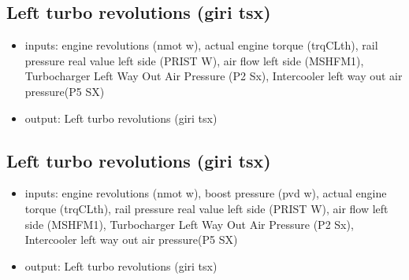 

\subsection{Left turbo revolutions (giri tsx)}
\begin{itemize}
	\item{inputs: engine revolutions (nmot w), actual engine torque (trqCLth), rail pressure real value left side (PRIST W), air flow left side (MSHFM1), Turbocharger Left Way Out Air Pressure (P2 Sx), Intercooler left way out air pressure(P5 SX)}
	\item{output: Left turbo revolutions (giri tsx)}
\end{itemize}	



\subsection{Left turbo revolutions (giri tsx)}
\begin{itemize}
	\item{inputs: engine revolutions (nmot w), boost pressure (pvd w), actual engine torque (trqCLth), rail pressure real value left side (PRIST W), air flow left side (MSHFM1), Turbocharger Left Way Out Air Pressure (P2 Sx), Intercooler left way out air pressure(P5 SX)}
	\item{output: Left turbo revolutions (giri tsx)}
\end{itemize}	




%
%




